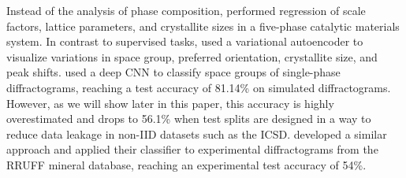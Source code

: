 Instead of the analysis of phase composition,
\citeauthor{dongDeepConvolutionalNeural2021} performed regression of scale
factors, lattice parameters, and crystallite sizes in a five-phase catalytic
materials system\supercite{dongDeepConvolutionalNeural2021}. In contrast to
supervised tasks, \citeauthor{bankoDeepLearningVisualization2021} used a
variational autoencoder to visualize variations in space group, preferred
orientation, crystallite size, and peak
shifts\supercite{bankoDeepLearningVisualization2021}.
\citeauthor{parkClassificationCrystalStructure2017} used a deep CNN to classify
space groups of single-phase diffractograms, reaching a test accuracy of 81.14\%
on simulated diffractograms.\supercite{parkClassificationCrystalStructure2017}
However, as we will show later in this paper, this accuracy is highly overestimated and drops to 56.1\% when test splits are designed in a way to reduce data leakage in non-IID datasets such as the ICSD.
\citeauthor{vecseiNeuralNetworkBased2019}\supercite{vecseiNeuralNetworkBased2019} developed
a similar approach and applied their classifier to experimental diffractograms
from the RRUFF mineral database\supercite{lafuentePowerDatabasesRRUFF2015},
reaching an experimental test accuracy of 54\%.









